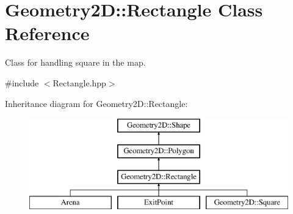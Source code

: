 \hypertarget{class_geometry2_d_1_1_rectangle}{}\section{Geometry2D\+:\+:Rectangle Class Reference}
\label{class_geometry2_d_1_1_rectangle}


Class for handling square in the map.  




{\ttfamily \#include $<$Rectangle.\+hpp$>$}

Inheritance diagram for Geometry2D\+:\+:Rectangle\+:\begin{figure}[H]
\begin{center}
\leavevmode
\includegraphics[height=4.000000cm]{class_geometry2_d_1_1_rectangle}
\end{center}
\end{figure}
